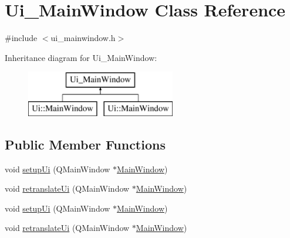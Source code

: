 \hypertarget{class_ui___main_window}{}\section{Ui\+\_\+\+Main\+Window Class Reference}
\label{class_ui___main_window}


{\ttfamily \#include $<$ui\+\_\+mainwindow.\+h$>$}

Inheritance diagram for Ui\+\_\+\+Main\+Window\+:\begin{figure}[H]
\begin{center}
\leavevmode
\includegraphics[height=2.000000cm]{df/dd7/class_ui___main_window}
\end{center}
\end{figure}
\subsection*{Public Member Functions}
\begin{DoxyCompactItemize}
\item 
void \mbox{\hyperlink{class_ui___main_window_acf4a0872c4c77d8f43a2ec66ed849b58}{setup\+Ui}} (Q\+Main\+Window $\ast$\mbox{\hyperlink{class_main_window}{Main\+Window}})
\item 
void \mbox{\hyperlink{class_ui___main_window_a097dd160c3534a204904cb374412c618}{retranslate\+Ui}} (Q\+Main\+Window $\ast$\mbox{\hyperlink{class_main_window}{Main\+Window}})
\item 
void \mbox{\hyperlink{class_ui___main_window_acf4a0872c4c77d8f43a2ec66ed849b58}{setup\+Ui}} (Q\+Main\+Window $\ast$\mbox{\hyperlink{class_main_window}{Main\+Window}})
\item 
void \mbox{\hyperlink{class_ui___main_window_a097dd160c3534a204904cb374412c618}{retranslate\+Ui}} (Q\+Main\+Window $\ast$\mbox{\hyperlink{class_main_window}{Main\+Window}})
\end{DoxyCompactItemize}
